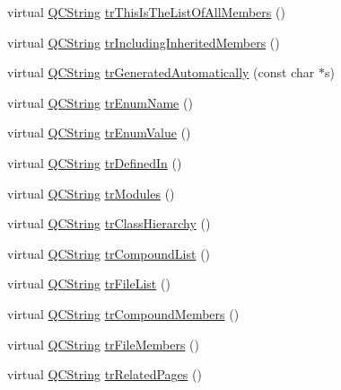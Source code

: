 \begin{DoxyCompactItemize}
\item 
virtual \hyperlink{class_q_c_string}{Q\-C\-String} \hyperlink{class_translator_indonesian_a011ff392bb2087e2804dc648db7b3bdd}{tr\-This\-Is\-The\-List\-Of\-All\-Members} ()
\item 
virtual \hyperlink{class_q_c_string}{Q\-C\-String} \hyperlink{class_translator_indonesian_ae6babe31ac1979ada5737392536bd239}{tr\-Including\-Inherited\-Members} ()
\item 
virtual \hyperlink{class_q_c_string}{Q\-C\-String} \hyperlink{class_translator_indonesian_a25156a73baa8406a915eaa5a6824b359}{tr\-Generated\-Automatically} (const char $\ast$s)
\item 
virtual \hyperlink{class_q_c_string}{Q\-C\-String} \hyperlink{class_translator_indonesian_a50df17e22ad96870c7937be7e1ab8dfc}{tr\-Enum\-Name} ()
\item 
virtual \hyperlink{class_q_c_string}{Q\-C\-String} \hyperlink{class_translator_indonesian_a5b1d2d5c6825641661ff2cfaeb84307e}{tr\-Enum\-Value} ()
\item 
virtual \hyperlink{class_q_c_string}{Q\-C\-String} \hyperlink{class_translator_indonesian_a5ee5473527c64fc3827deca81e253acf}{tr\-Defined\-In} ()
\item 
virtual \hyperlink{class_q_c_string}{Q\-C\-String} \hyperlink{class_translator_indonesian_aef7bca894dd93b7fd6803518cede7ef7}{tr\-Modules} ()
\item 
virtual \hyperlink{class_q_c_string}{Q\-C\-String} \hyperlink{class_translator_indonesian_a6676bf94846fa80e4a23cf9ea3214b54}{tr\-Class\-Hierarchy} ()
\item 
virtual \hyperlink{class_q_c_string}{Q\-C\-String} \hyperlink{class_translator_indonesian_adc612d045d0abf0cfa5085254fca8db5}{tr\-Compound\-List} ()
\item 
virtual \hyperlink{class_q_c_string}{Q\-C\-String} \hyperlink{class_translator_indonesian_a1c967abf4f2578ff4185ab2e10f71e14}{tr\-File\-List} ()
\item 
virtual \hyperlink{class_q_c_string}{Q\-C\-String} \hyperlink{class_translator_indonesian_a05e152ef7d0c15bb2b34fc12e1a25c56}{tr\-Compound\-Members} ()
\item 
virtual \hyperlink{class_q_c_string}{Q\-C\-String} \hyperlink{class_translator_indonesian_ae5ab09d67500e729b9f1b29f4ea57425}{tr\-File\-Members} ()
\item 
virtual \hyperlink{class_q_c_string}{Q\-C\-String} \hyperlink{class_translator_indonesian_a8ed40826492d6303375b3031fc88d3b2}{tr\-Related\-Pages} ()
\item 

\end{DoxyCompactItemize}
